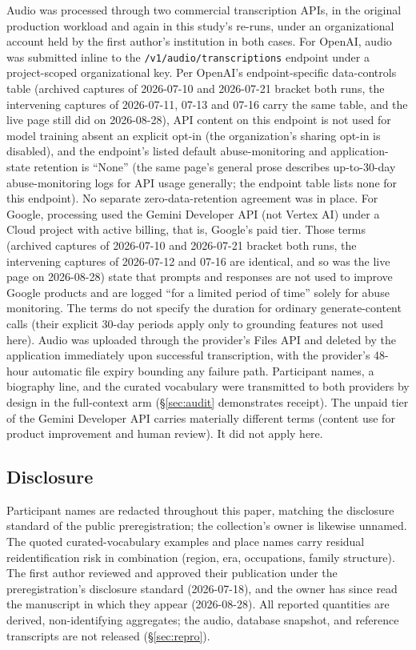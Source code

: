 \documentclass[11pt]{article}
\begin{document}
Audio was processed through two commercial transcription APIs, in the original production workload and again in this study's re-runs, under an organizational account held by the first author's institution in both cases. For OpenAI, audio was submitted inline to the \texttt{/v1/audio/transcriptions} endpoint under a project-scoped organizational key. Per OpenAI's endpoint-specific data-controls table \citep{openai26c} (archived captures of 2026-07-10 and 2026-07-21 bracket both runs, the intervening captures of 2026-07-11, 07-13 and 07-16 carry the same table, and the live page still did on 2026-08-28), API content on this endpoint is not used for model training absent an explicit opt-in (the organization's sharing opt-in is disabled), and the endpoint's listed default abuse-monitoring and application-state retention is ``None'' (the same page's general prose describes up-to-30-day abuse-monitoring logs for API usage generally; the endpoint table lists none for this endpoint). No separate zero-data-retention agreement was in place. For Google, processing used the Gemini Developer API (not Vertex AI) under a Cloud project with active billing, that is, Google's paid tier. Those terms \citep{google26a} (archived captures of 2026-07-10 and 2026-07-21 bracket both runs, the intervening captures of 2026-07-12 and 07-16 are identical, and so was the live page on 2026-08-28) state that prompts and responses are not used to improve Google products and are logged ``for a limited period of time'' solely for abuse monitoring. The terms do not specify the duration for ordinary generate-content calls (their explicit 30-day periods apply only to grounding features not used here). Audio was uploaded through the provider's Files API and deleted by the application immediately upon successful transcription, with the provider's 48-hour automatic file expiry \citep{google26b} bounding any failure path. Participant names, a biography line, and the curated vocabulary were transmitted to both providers by design in the full-context arm (\S\ref{sec:audit} demonstrates receipt). The unpaid tier of the Gemini Developer API carries materially different terms (content use for product improvement and human review). It did not apply here.

\subsection{Disclosure}

Participant names are redacted throughout this paper, matching the disclosure standard of the public preregistration; the collection's owner is likewise unnamed. The quoted curated-vocabulary examples and place names carry residual reidentification risk in combination (region, era, occupations, family structure). The first author reviewed and approved their publication under the preregistration's disclosure standard (2026-07-18), and the owner has since read the manuscript in which they appear (2026-08-28). All reported quantities are derived, non-identifying aggregates; the audio, database snapshot, and reference transcripts are not released (\S\ref{sec:repro}).
\end{document}
